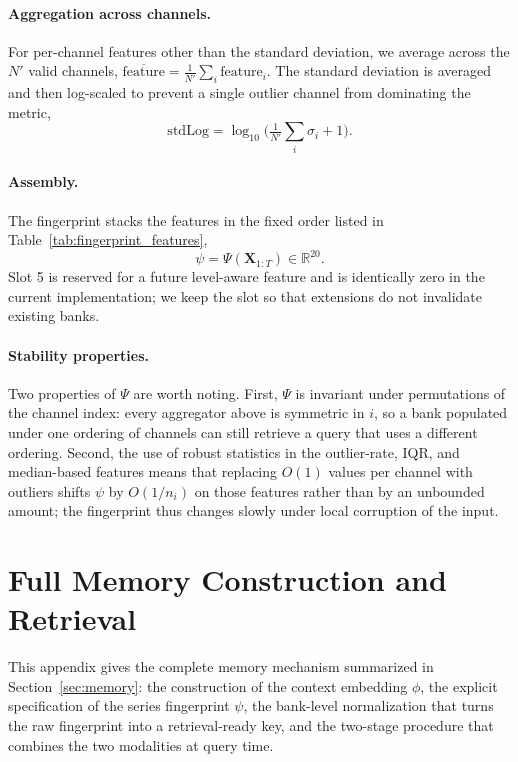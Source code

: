 \paragraph{Aggregation across channels.}
For per-channel features other than the standard deviation, we average
across the $N'$ valid channels,
$\overline{\mathrm{feature}} = \frac{1}{N'} \sum_i \mathrm{feature}_i$.
The standard deviation is averaged and then log-scaled to prevent a
single outlier channel from dominating the metric,
\begin{equation}
    \mathrm{stdLog} = \log_{10}\!\Big( \tfrac{1}{N'}
                       \textstyle\sum_i \sigma_i + 1 \Big).
\end{equation}

\paragraph{Assembly.}
The fingerprint stacks the features in the fixed order listed in
Table~\ref{tab:fingerprint_features},
\begin{equation}
    \psi = \Psi(\mathbf{X}_{1:T}) \in \mathbb{R}^{20}.
\end{equation}
Slot 5 is reserved for a future level-aware feature and is identically
zero in the current implementation; we keep the slot so that
extensions do not invalidate existing banks.

\paragraph{Stability properties.}
Two properties of $\Psi$ are worth noting. First, $\Psi$ is invariant
under permutations of the channel index: every aggregator above is
symmetric in $i$, so a bank populated under one ordering of channels
can still retrieve a query that uses a different ordering. Second, the
use of robust statistics in the outlier-rate, IQR, and median-based
features means that replacing $O(1)$ values per channel with outliers
shifts $\psi$ by $O(1/n_i)$ on those features rather than by an
unbounded amount; the fingerprint thus changes slowly under local
corruption of the input.



\section{Full Memory Construction and Retrieval}
\label{ap:multimodal_memory}

This appendix gives the complete  memory
mechanism summarized in Section~\ref{sec:memory}: the construction of
the context embedding $\phi$, the explicit specification of the series
fingerprint $\psi$, the bank-level normalization that turns the raw
fingerprint into a retrieval-ready key, and the two-stage procedure
that combines the two modalities at query time.

